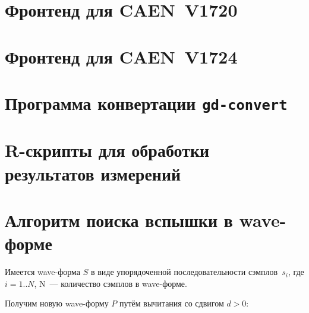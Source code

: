 \documentclass[12pt, a4paper, oneside, onecolumn]{book}
\newcommand{\APP}[1]{\mbox{\tt #1}}
\begin{document}

\newcommand{\FE}{\APP{fe-v1720}}
\newcommand{\DEVICE}{CAEN~V1720}

\chapter{Фронтенд для \DEVICE{}}
\label{sec-fe-v1720}




\renewcommand{\FE}{\APP{fe-v1724}}
\renewcommand{\DEVICE}{CAEN~V1724}

\chapter{Фронтенд для \DEVICE{}}




\newcommand{\GDCONVERT}{\APP{gd-convert}}

\chapter{Программа конвертации \GDCONVERT}




\chapter{R-скрипты для обработки результатов измерений}




\appendix

\chapter{Алгоритм поиска вспышки в wave-форме}

Имеется wave-форма $S$ в виде упорядоченной последовательности сэмплов~$s_i$, где $i = 1..N$, N~--- количество сэмплов в wave-форме.

Получим новую wave-форму $P$ путём вычитания со сдвигом $d > 0$:
\end{document}
